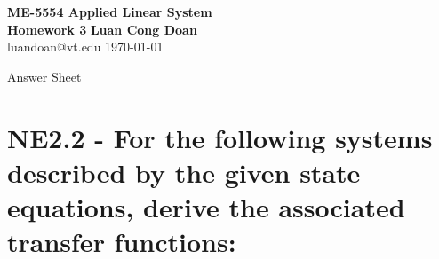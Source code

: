 \documentclass[14pt,a4paper]{article}
\begin{document}
\label{cover}
\begin{center}
	\vfill
	\vspace{50cm}
	\large{\textbf{ME-5554 Applied Linear System \\ Homework 3}}
	\vfill
	\textbf{Luan Cong Doan} \\ luandoan@vt.edu
	\vfill
	\today
\end{center}
\pagebreak
	
\large{Answer Sheet}
\label{Numerical Exercises}
\section{NE2.2 - For the following systems described by the given state equations, derive the associated transfer functions:}
\end{document}
